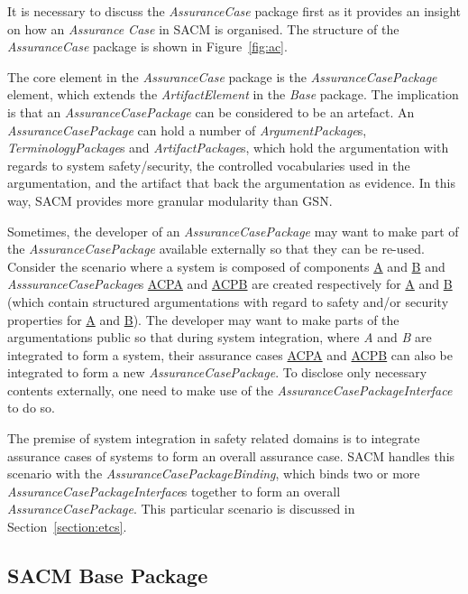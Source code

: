 It is necessary to discuss the \textit{AssuranceCase} package first as it provides an insight on how an \textit{Assurance Case} in SACM is organised. 
The structure of the \textit{AssuranceCase} package is shown in Figure~\ref{fig:ac}.


The core element in the \textit{AssuranceCase} package is the \textit{AssuranceCasePackage} element, which extends the \textit{ArtifactElement} in the \textit{Base} package. 
The implication is that an \textit{AssuranceCasePackage} can be considered to be an artefact. 
An \textit{AssuranceCasePackage} can hold a number of \textit{ArgumentPackage}s, \textit{TerminologyPackage}s and \textit{ArtifactPackage}s, which hold the argumentation with regards to system safety/security, the controlled vocabularies used in the argumentation, and the artifact that back the argumentation as evidence.
In this way, SACM provides more granular modularity than GSN. 

Sometimes, the developer of an \textit{AssuranceCasePackage} may want to make part of the \textit{AssuranceCasePackage} available externally so that they can be re-used. 
Consider the scenario where a system is composed of components \underline{A} and \underline{B} and \textit{AsssuranceCasePackage}s \underline{ACPA} and \underline{ACPB} are created respectively for \underline{A} and \underline{B} (which contain structured argumentations with regard to safety and/or security properties for \underline{A} and \underline{B}). 
The developer may want to make parts of the argumentations public so that during system integration, where \textit{A} and \textit{B} are integrated to form a system, their assurance cases \underline{ACPA} and \underline{ACPB} can also be integrated to form a new \textit{AssuranceCasePackage}. 
To disclose only necessary contents externally, one need to make use of the \textit{AssuranceCasePackageInterface} to do so. 

The premise of system integration in safety related domains is to integrate assurance cases of systems to form an overall assurance case. SACM handles this scenario with the \textit{AssuranceCasePackageBinding}, which binds two or more \textit{AssuranceCasePackageInterface}s together to form an overall \textit{AssuranceCasePackage}. This particular scenario is discussed in Section~\ref{section:etcs}.

\subsection{SACM Base Package}
\label{sec:basePack}

